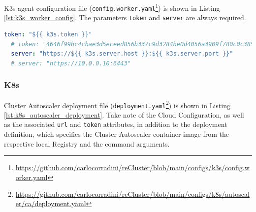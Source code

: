 K3s agent configuration file (\texttt{config.worker.yaml}\footnote{\url{https://github.com/carlocorradini/reCluster/blob/main/configs/k3s/config.worker.yaml}})
is shown in Listing \ref{lst:k3s_worker_config}. The parameters \texttt{token} and
\texttt{server} are always required.

\begin{lstlisting}[language=yaml, alsoletter={.}, morekeywords={[2]{token, server}}, xleftmargin=\parindent, label={lst:k3s_worker_config}, caption=K3s agent configuration file]
  token: "${{ k3s.token }}"
  # token: "4646f99bc4cbae3d5eceed856b337c9d3284be0d4056a3909f780c0c385fbf93"
  server: "https://${{ k3s.server.host }}:${{ k3s.server.port }}"
  # server: "https://10.0.0.10:6443"
\end{lstlisting}

\subsubsection{K8s}
\label{subsubsec:implementation_installer_configuration_filesn_k8s}

Cluster Autoscaler deployment file (\texttt{deployment.yaml}\footnote{\url{https://github.com/carlocorradini/reCluster/blob/main/configs/k8s/autoscaler/ca/deployment.yaml}})
is shown in Listing \ref{lst:k8s_autoscaler_deployment}. Take note of the Cloud
Configuration, as well as the associated \texttt{url} and \texttt{token} attributes,
in addition to the deployment definition, which specifies the Cluster Autoscaler
container image from the respective local Registry and the command arguments.

